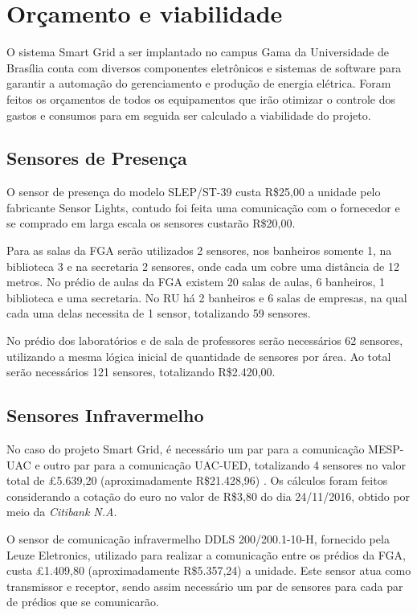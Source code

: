 \section{Orçamento e viabilidade}

O sistema Smart Grid a ser implantado no campus Gama da Universidade de Brasília conta com diversos componentes eletrônicos e sistemas de software para garantir a automação do gerenciamento e produção de energia elétrica. Foram feitos os orçamentos de todos os equipamentos que irão otimizar o controle dos gastos e consumos para em seguida ser calculado a viabilidade do projeto.

\subsection{Sensores de Presença}
O sensor de presença do modelo SLEP/ST-39 custa R\$25,00 a unidade pelo fabricante Sensor Lights, contudo foi feita uma comunicação com o fornecedor e se comprado em larga escala os sensores custarão R\$20,00.

Para as salas da FGA serão utilizados 2 sensores, nos banheiros somente 1, na biblioteca 3 e na secretaria 2 sensores, onde cada um cobre uma distância de 12 metros. No prédio de aulas da FGA existem 20 salas de aulas, 6 banheiros, 1 biblioteca e uma secretaria. No RU há 2 banheiros e 6 salas de empresas, na qual cada uma delas necessita de 1 sensor, totalizando 59 sensores.

No prédio dos laboratórios e de sala de professores serão necessários 62 sensores, utilizando a mesma lógica inicial de quantidade de sensores por área. Ao total serão necessários 121 sensores, totalizando R\$2.420,00. 

\subsection{Sensores Infravermelho}
No caso do projeto Smart Grid, é necessário um par para a comunicação MESP-UAC e outro par para a comunicação UAC-UED, totalizando 4 sensores no valor total de £5.639,20 (aproximadamente R\$21.428,96) \cite{1}. Os cálculos foram feitos considerando a cotação do euro no valor de R\$3,80 do dia 24/11/2016, obtido por meio da \textit{Citibank N.A}.

O sensor de comunicação infravermelho DDLS 200/200.1-10-H, fornecido pela Leuze Eletronics, utilizado para realizar a comunicação entre os prédios da FGA, custa £1.409,80 (aproximadamente R\$5.357,24) a unidade. Este sensor atua como transmissor e receptor, sendo assim necessário um par de sensores para cada par de prédios que se comunicarão.

